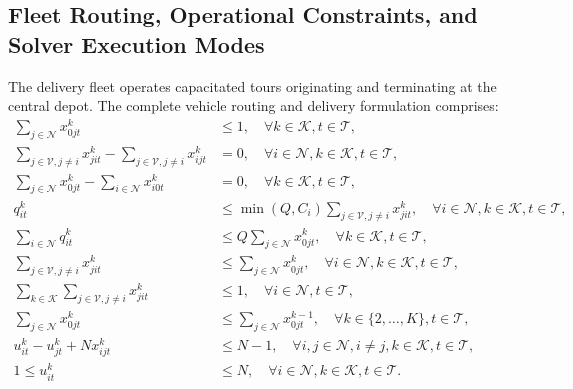 \documentclass[11pt,a4paper]{article}
\theoremstyle{definition}
\theoremstyle{remark}
\begin{document}
\subsection{Fleet Routing, Operational Constraints, and Solver Execution Modes}
\label{subsec:routing_constraints}
The delivery fleet operates capacitated tours originating and terminating at the central depot. The complete vehicle routing and delivery formulation comprises:
\begin{align}
    \sum_{j \in \mathcal{N}} x_{0jt}^k &\le 1, \quad \forall k \in \mathcal{K}, t \in \mathcal{T}, \label{eq:depot_depart} \\
    \sum_{j \in \mathcal{V}, j \neq i} x_{jit}^k - \sum_{j \in \mathcal{V}, j \neq i} x_{ijt}^k &= 0, \quad \forall i \in \mathcal{N}, k \in \mathcal{K}, t \in \mathcal{T}, \label{eq:flow_cons} \\
    \sum_{j \in \mathcal{N}} x_{0jt}^k - \sum_{i \in \mathcal{N}} x_{i0t}^k &= 0, \quad \forall k \in \mathcal{K}, t \in \mathcal{T}, \label{eq:depot_return} \\
    q_{it}^k &\le \min(Q, C_i) \sum_{j \in \mathcal{V}, j \neq i} x_{jit}^k, \quad \forall i \in \mathcal{N}, k \in \mathcal{K}, t \in \mathcal{T}, \label{eq:visit_link} \\
    \sum_{i \in \mathcal{N}} q_{it}^k &\le Q \sum_{j \in \mathcal{N}} x_{0jt}^k, \quad \forall k \in \mathcal{K}, t \in \mathcal{T}, \label{eq:veh_capacity} \\
    \sum_{j \in \mathcal{V}, j \neq i} x_{jit}^k &\le \sum_{j \in \mathcal{N}} x_{0jt}^k, \quad \forall i \in \mathcal{N}, k \in \mathcal{K}, t \in \mathcal{T}, \label{eq:visit_depot_link} \\
    \sum_{k \in \mathcal{K}} \sum_{j \in \mathcal{V}, j \neq i} x_{jit}^k &\le 1, \quad \forall i \in \mathcal{N}, t \in \mathcal{T}, \label{eq:single_visit} \\
    \sum_{j \in \mathcal{N}} x_{0jt}^k &\le \sum_{j \in \mathcal{N}} x_{0jt}^{k-1}, \quad \forall k \in \{2, \dots, K\}, t \in \mathcal{T}, \label{eq:sym_break} \\
    u_{it}^k - u_{jt}^k + N x_{ijt}^k &\le N - 1, \quad \forall i, j \in \mathcal{N}, i \neq j, k \in \mathcal{K}, t \in \mathcal{T}, \label{eq:mtz_subtour} \\
    1 \le u_{it}^k &\le N, \quad \forall i \in \mathcal{N}, k \in \mathcal{K}, t \in \mathcal{T}. \label{eq:mtz_bounds}
\end{align}
\end{document}
